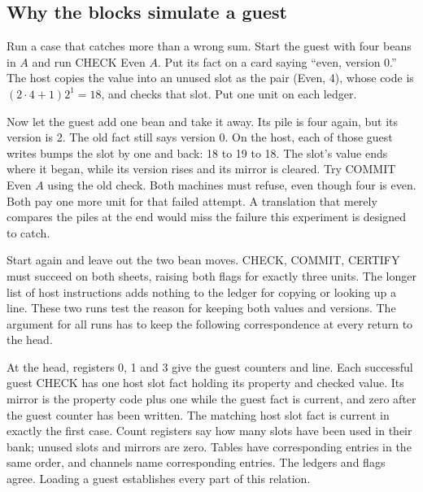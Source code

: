 \documentclass[11pt,twoside]{article}
\theoremstyle{thielethm}
\theoremstyle{thieledef}
\theoremstyle{thieledef}
\theoremstyle{thieledef}
\theoremstyle{thielethm}
\theoremstyle{thieleobs}
\theoremstyle{thielethm}
\begin{document}
\subsection{Why the blocks simulate a guest}

Run a case that catches more than a wrong sum. Start the guest with four beans
in $A$ and run CHECK Even $A$. Put its fact on a card saying ``even, version 0.''
The host copies the value into an unused slot as the pair (Even, 4), whose code
is $(2\cdot4+1)2^1=18$, and checks that slot. Put one unit on each ledger.

Now let the guest add one bean and take it away. Its pile is four again, but its
version is 2. The old fact still says version 0. On the host, each of those guest
writes bumps the slot by one and back: 18 to 19 to 18. The slot's value ends where
it began, while its version rises and its mirror is cleared. Try COMMIT Even $A$
using the old check. Both machines must refuse, even though four is even. Both
pay one more unit for that failed attempt. A translation that merely compares
the piles at the end would miss the failure this experiment is designed to catch.

Start again and leave out the two bean moves. CHECK, COMMIT, CERTIFY must succeed
on both sheets, raising both flags for exactly three units. The longer list of host instructions adds nothing to the ledger for copying or looking up a line. These
two runs test the reason for keeping both values and versions. The argument for
all runs has to keep the following correspondence at every return to the head.

At the head, registers 0, 1 and 3 give the guest counters and line. Each successful
guest CHECK has one host slot fact holding its property and checked value. Its mirror
is the property code plus one while the guest fact is current, and zero after the
guest counter has been written. The matching host slot fact is current in exactly
the first case. Count registers say how many slots have been used in their bank;
unused slots and mirrors are zero. Tables have corresponding entries in the same
order, and channels name corresponding entries. The ledgers and flags agree.
Loading a guest establishes every part of this relation.
\end{document}
